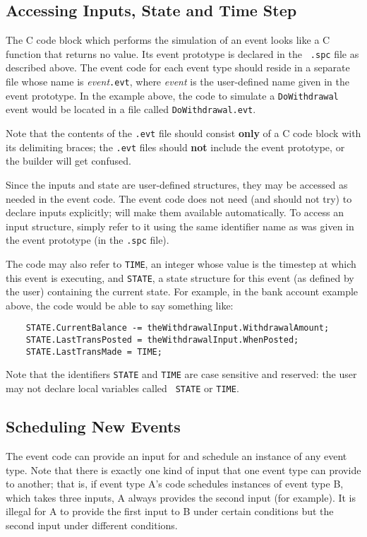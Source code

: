 \subsection{Accessing Inputs, State and Time Step}

The C code block which performs the simulation of an event looks like a
C function that returns no value.  Its event prototype is declared in the {\tt
.spc} file as described above.  The event code for each event type
should reside in a separate file whose name is {\em event}{\tt .evt},
where {\em event} is the user-defined name given in the event prototype.
In the example above, the code to simulate a {\tt DoWithdrawal} event
would be located in a file called {\tt DoWithdrawal.evt}.

Note that the contents of the {\tt .evt} file should consist {\bf only}
of a C code block with its delimiting braces; the {\tt .evt} files
should {\bf not} include the event prototype, or the \dispare builder
will get confused.

Since the inputs and state are user-defined structures, they may be accessed
as needed in the event code.  The event code does not need (and should
not try) to declare inputs explicitly; \dispare will make them available
automatically.  To access an input structure, simply refer
to it using the same identifier name as was given in the event prototype
(in the {\tt .spc} file).  

The code may also refer to {\tt TIME}, an integer whose value is the
timestep at which this event is executing, and {\tt STATE}, a state
structure for this event (as defined by the user) containing the current
state.  For example, in the bank account example above, the code would
be able to say something like:

\begin{verbatim}
	STATE.CurrentBalance -= theWithdrawalInput.WithdrawalAmount;
	STATE.LastTransPosted = theWithdrawalInput.WhenPosted;
	STATE.LastTransMade = TIME;
\end{verbatim}

Note that the identifiers {\tt STATE} and {\tt TIME} are  case sensitive
and reserved: the user may not declare local variables called {\tt
STATE} or {\tt TIME}. 

\subsection{Scheduling New Events}

The event code can provide an input for and schedule an instance of any
event type.  Note that there is exactly one kind of input that one event
type can provide to another; that is, if event type A's code schedules
instances of event type B, which takes three inputs, A always provides
the second input (for example).  It is illegal for A to provide the
first input to B under certain conditions but the second input under
different conditions.


